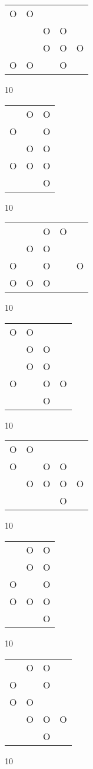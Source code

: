 \begin{tabular}{|m{0.2cm}m{0.2cm}m{0.2cm}m{0.2cm}m{0.2cm}|}\hline
O&O& & & \\
 & &O&O& \\
 & &O&O&O\\
O&O& &O& \\
\hline\end{tabular}10
\begin{tabular}{|m{0.2cm}m{0.2cm}m{0.2cm}|}\hline
 &O&O\\
O& &O\\
 &O&O\\
O&O&O\\
 & &O\\
\hline\end{tabular}10
\begin{tabular}{|m{0.2cm}m{0.2cm}m{0.2cm}m{0.2cm}m{0.2cm}|}\hline
 & &O&O& \\
 &O&O& & \\
O& &O& &O\\
O&O&O& & \\
\hline\end{tabular}10
\begin{tabular}{|m{0.2cm}m{0.2cm}m{0.2cm}m{0.2cm}|}\hline
O&O& & \\
 &O&O& \\
 &O&O& \\
O& &O&O\\
 & &O& \\
\hline\end{tabular}10
\begin{tabular}{|m{0.2cm}m{0.2cm}m{0.2cm}m{0.2cm}m{0.2cm}|}\hline
O&O& & & \\
O& &O&O& \\
 &O&O&O&O\\
 & & &O& \\
\hline\end{tabular}10
\begin{tabular}{|m{0.2cm}m{0.2cm}m{0.2cm}|}\hline
 &O&O\\
 &O&O\\
O& &O\\
O&O&O\\
 & &O\\
\hline\end{tabular}10
\begin{tabular}{|m{0.2cm}m{0.2cm}m{0.2cm}m{0.2cm}|}\hline
 &O&O& \\
O& &O& \\
O&O& & \\
 &O&O&O\\
 & &O& \\
\hline\end{tabular}10
